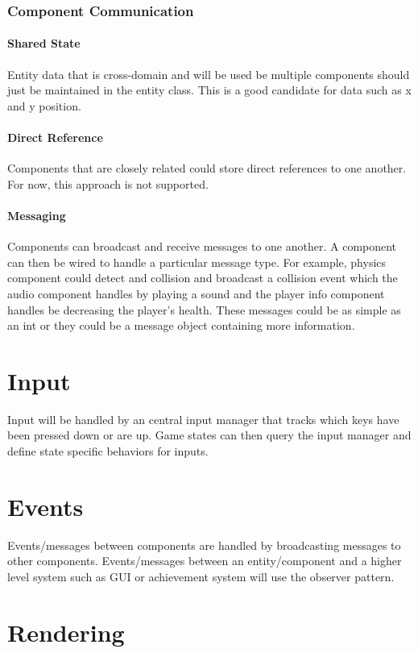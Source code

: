 \documentclass[12pt]{article}
\begin{document}
\subsubsection{ Component Communication }
\paragraph{ Shared State}
Entity data that is cross-domain and will be used be multiple components should just be maintained in the entity class.  This is a good candidate for data such as x and y position.
\paragraph{ Direct Reference }
Components that are closely related could store direct references to one another.  For now, this approach is not supported.
\paragraph{ Messaging }
Components can broadcast and receive messages to one another.  A component can then be wired to handle a particular message type.  For example, physics component could detect and collision and broadcast a collision event which the audio component handles by playing a sound and the player info component handles be decreasing the player's health.  These messages could be as simple as an int or they could be a message object containing more information.

\section{	Input }
Input will be handled by an central input manager that tracks which keys have been pressed down or are up.  Game states can then query the input manager and define state specific behaviors for inputs.

\section{	Events }
Events/messages between components are handled by broadcasting messages to other components.  Events/messages between an entity/component and a higher level system such as GUI or achievement system will use the observer pattern.  

\section{	Rendering }
\end{document}
